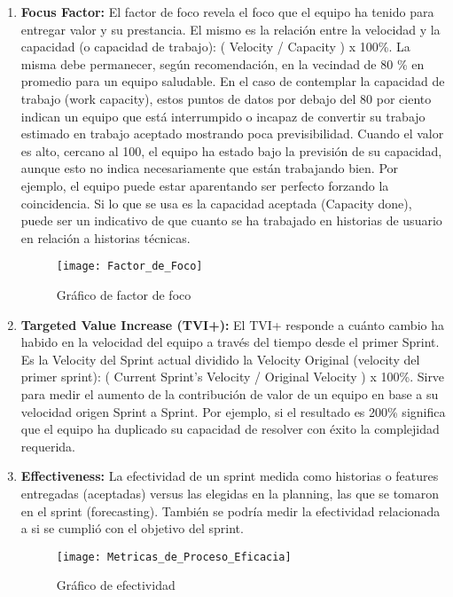 \begin{enumerate}
\item {\textbf{Focus Factor:} El factor de foco revela el foco que el equipo ha tenido para entregar valor y su prestancia. El mismo es la relación entre la velocidad y la capacidad (o capacidad de trabajo): ( Velocity / Capacity ) x 100\%. La misma debe permanecer, según recomendación, en la vecindad de 80 \% en promedio para un equipo saludable. En el caso de contemplar la capacidad de trabajo (work capacity), estos puntos de datos por debajo del 80 por ciento indican un equipo que está interrumpido o incapaz de convertir su trabajo estimado en trabajo aceptado mostrando poca previsibilidad. Cuando el valor es alto, cercano al 100, el equipo ha estado bajo la previsión de su capacidad, aunque esto no indica necesariamente que están trabajando bien. Por ejemplo, el equipo puede estar aparentando ser perfecto forzando la coincidencia. Si lo que se usa es la capacidad aceptada (Capacity done), puede ser un indicativo de que cuanto se ha trabajado en historias de usuario en relación a historias técnicas.}

  \begin{figure}[h]
  \centering
  \texttt{[image: Factor\_de\_Foco]}
  \caption{Gráfico de factor de foco}
  \centering
  \label{fig:Factor_de_Foco} %
  \end{figure}
  \FloatBarrier

\item {\textbf{Targeted Value Increase (TVI+):} El TVI+ responde a cuánto cambio ha habido en la velocidad del equipo a través del tiempo desde el primer Sprint. Es la Velocity del Sprint actual dividido la Velocity Original (velocity del primer sprint): ( Current Sprint’s Velocity / Original Velocity ) x 100\%. Sirve para medir el aumento de la contribución de valor de un equipo en base a su velocidad origen Sprint a Sprint.
Por ejemplo, si el resultado es 200\% significa que el equipo ha duplicado su capacidad de resolver con éxito la complejidad requerida.
}

\item {\textbf{Effectiveness:} La efectividad de un sprint medida como historias o features entregadas (aceptadas) versus las elegidas en la planning, las que se tomaron en el sprint (forecasting). También se podría medir la efectividad relacionada a si se cumplió con el objetivo del sprint.
}

  \begin{figure}[h]
  \centering
  \texttt{[image: Metricas\_de\_Proceso\_Eficacia]}
  \caption{Gráfico de efectividad}
  \centering
  \label{fig:Metricas_de_Proceso_Eficacia} %
  \end{figure}
  \FloatBarrier
  

\end{enumerate}
